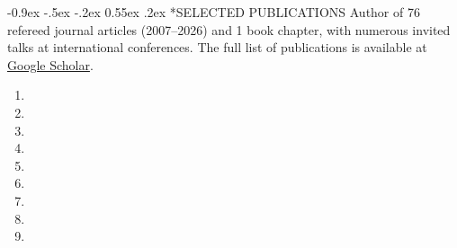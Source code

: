 \documentclass[a4paper,fontsize=10pt]{scrartcl}
\makeatletter
\renewcommand{\section}{\@startsection{section}{1}{\z@}%
  {-0.9ex \@plus -.5ex \@minus -.2ex}%
  {0.55ex \@plus .2ex}%
  {\normalfont\large\bfseries}}
\newcommand{\NewPart}[1]{\section*{\uppercase{#1}}}
\makeatother
\begin{document}
\NewPart{Selected Publications}
Author of 76 refereed journal articles (2007--2026) and 1 book chapter, with numerous invited talks at international conferences. The full list of publications is available at \href{https://scholar.google.co.jp/citations?hl=ja&user=o23rFB8AAAAJ&view_op=list_works&sortby=pubdate}{Google Scholar}.

\begin{enumerate}\small
	\setlength{\itemsep}{0.15em}
	\item {}
	\item {}
	\item {}
	\item {}
	\item {}
	\item {}
	\item {}
	\item {}
	\item {}
\end{enumerate}
\end{document}
